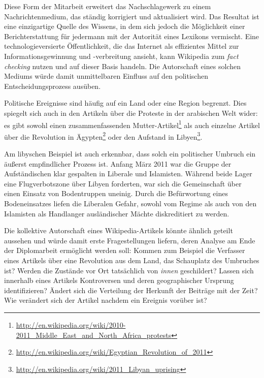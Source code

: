 
Diese Form der Mitarbeit erweitert das Nachschlagewerk zu einem Nachrichtenmedium, das ständig korrigiert und aktualisiert wird. 
Das Resultat ist eine einzigartige Quelle des Wissens, in dem sich jedoch die Möglichkeit einer Berichterstattung für jedermann mit der Autorität eines Lexikons vermischt. 
Eine technologieversierte Öffentlichkeit, die das Internet als effizientes Mittel zur Informationsgewinnung und -verbreitung ansieht, kann Wikipedia zum \emph{fact checking} nutzen und auf dieser Basis handeln.\cite[S. 424-427]{chadwick2009routledge}
Die Autorschaft eines solchen Mediums würde damit unmittelbaren Einfluss auf den politischen Entscheidungsprozess ausüben.


Politische Ereignisse sind häufig auf ein Land oder eine Region begrenzt.
Dies spiegelt sich auch in den Artikeln über die Proteste in der arabischen Welt wider: es gibt sowohl einen zusammenfassenden \glqq Mutter-Artikel\grqq\footnote{\url{http://en.wikipedia.org/wiki/2010-2011_Middle_East_and_North_Africa_protests}} als auch einzelne Artikel über die Revolution in Ägypten\footnote{\url{http://en.wikipedia.org/wiki/Egyptian_Revolution_of_2011}} oder den Aufstand in Libyen\footnote{\url{http://en.wikipedia.org/wiki/2011_Libyan_uprising}}.


Am libyschen Beispiel ist auch erkennbar, dass solch ein politischer Umbruch ein äußerst empfindlicher Prozess ist.
Anfang März 2011 war die Gruppe der Aufständischen klar gespalten in Liberale und Islamisten.
Während beide Lager eine Flugverbotszone über Libyen forderten, war sich die Gemeinschaft über einen Einsatz von Bodentruppen uneinig.
Durch die Befürwortung eines Bodeneinsatzes liefen die Liberalen Gefahr, sowohl vom Regime als auch von den Islamisten als Handlanger ausländischer Mächte diskreditiert zu werden.\cite{econ18290470}


Die kollektive Autorschaft eines Wikipedia-Artikels könnte ähnlich geteilt aussehen und würde damit erste Fragestellungen liefern, deren Analyse am Ende der Diplomarbeit ermöglicht werden soll:  
Kommen zum Beispiel die Verfasser eines Artikels über eine Revolution aus dem Land, das Schauplatz des Umbruches ist? 
Werden die Zustände vor Ort tatsächlich von \emph{innen} geschildert?
Lassen sich innerhalb eines Artikels Kontroversen und deren geographischer Ursprung identifizieren?
Ändert sich die Verteilung der Herkunft der Beiträge mit der Zeit? 
Wie verändert sich der Artikel nachdem ein Ereignis vorüber ist?

